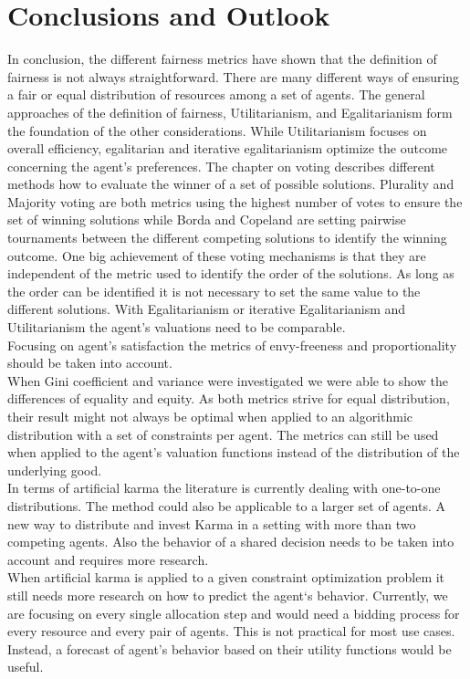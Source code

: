 \documentclass[german, a4paper, 11pt, oneside]{scrbook}
\begin{document}
\chapter{Conclusions and Outlook}
In conclusion, the different fairness metrics have shown that the definition of fairness is not always straightforward. There are many different ways of ensuring a fair or equal distribution of resources among a set of agents. The general approaches of the definition of fairness, Utilitarianism, and Egalitarianism form the foundation of the other considerations. While Utilitarianism focuses on overall efficiency, egalitarian and iterative egalitarianism optimize the outcome concerning the agent's preferences. The chapter on voting describes different methods how to evaluate the winner of a set of possible solutions. Plurality and Majority voting are both metrics using the highest number of votes to ensure the set of winning solutions while Borda and Copeland are setting pairwise tournaments between the different competing solutions to identify the winning outcome. One big achievement of these voting mechanisms is that they are independent of the metric used to identify the order of the solutions. As long as the order can be identified it is not necessary to set the same value to the different solutions. With Egalitarianism or iterative Egalitarianism and Utilitarianism the agent's valuations need to be comparable. \\Focusing on agent's satisfaction the metrics of envy-freeness and proportionality should be taken into account.
\\When Gini coefficient and variance were investigated we were able to show the differences of equality and equity. As both metrics strive for equal distribution, their result might not always be optimal when applied to an algorithmic distribution with a set of constraints per agent. The metrics can still be used when applied to the agent's valuation functions instead of the distribution of the underlying good.
\\In terms of artificial karma the literature is currently dealing with one-to-one distributions. The method could also be applicable to a larger set of agents. A new way to distribute and invest Karma in a setting with more than two competing agents. Also the behavior of a shared decision needs to be taken into account and requires more research. 
\\When artificial karma is applied to a given constraint optimization problem it still needs more research on how to predict the agent`s behavior. Currently, we are focusing on every single allocation step and would need a bidding process for every resource and every pair of agents. This is not practical for most use cases. Instead, a forecast of agent's behavior based on their utility functions would be useful. 
\end{document}
